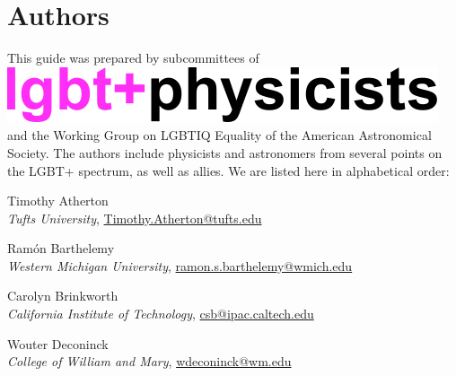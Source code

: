 %

\chapter{Authors}	%
\label{authors}		%
\normalsize			%

This guide was prepared by subcommittees of \vspace{0pt}\includegraphics[scale=0.35]{lgbt+physicists_logo.pdf} and the Working Group on LGBTIQ Equality of the American Astronomical Society. The authors include physicists and astronomers from several points on the LGBT+ spectrum, as well as allies. We are listed here in alphabetical order:


\vspace*{\baselineskip}

\noindent Timothy Atherton\\
\indent \emph{Tufts University}, \href{mailto:Timothy.Atherton@tufts.edu}{Timothy.Atherton@tufts.edu}\vspace*{\baselineskip}

\noindent Ram\'{o}n Barthelemy\\
\indent \emph{Western Michigan University}, \href{mailto:ramon.s.barthelemy@wmich.edu}{ramon.s.barthelemy@wmich.edu}\vspace*{\baselineskip}

\noindent Carolyn Brinkworth\\
\indent \emph{California Institute of Technology}, \href{mailto:csb@ipac.caltech.edu}{csb@ipac.caltech.edu}\vspace*{\baselineskip}

\noindent Wouter Deconinck\\
\indent \emph{College of William and Mary}, \href{mailto:wdeconinck@wm.edu}{wdeconinck@wm.edu}\vspace*{\baselineskip}


